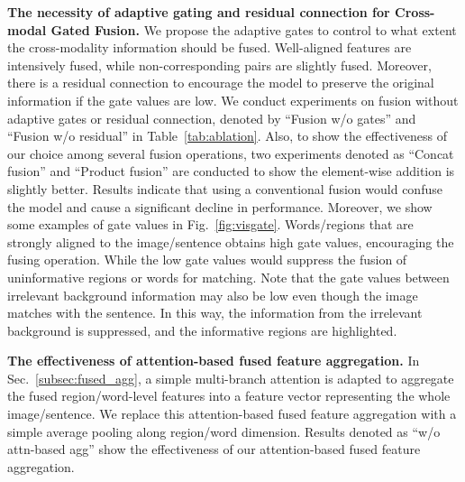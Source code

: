 \documentclass[10pt,twocolumn,letterpaper]{article}
\begin{document}
\noindent\textbf{The necessity of adaptive gating and residual connection for Cross-modal Gated Fusion.}
We propose the adaptive gates to control to what extent the cross-modality information should be fused. 
Well-aligned features are intensively fused, while non-corresponding pairs are slightly fused. 
Moreover, there is a residual connection to encourage the model to preserve the original information if the gate values are low.
We conduct experiments on fusion without adaptive gates or residual connection, denoted by ``Fusion w/o gates'' and ``Fusion w/o residual'' in Table~\ref{tab:ablation}. Also, to show the effectiveness of our choice among several fusion operations, two experiments denoted as ``Concat fusion'' and ``Product fusion'' are conducted to show the element-wise addition is slightly better.
Results 
indicate that using a conventional fusion would confuse the model and cause a significant decline in performance.
Moreover, we show some examples of gate values in Fig.~\ref{fig:visgate}. Words/regions that are strongly aligned to the image/sentence obtains high gate values, encouraging the fusing operation. While the low gate values would suppress the fusion of uninformative regions or words for matching.
Note that the gate values between irrelevant background information may also be low even though the image matches with the sentence.
In this way, the information from the irrelevant background is suppressed, and the informative regions are highlighted.

\noindent\textbf{The effectiveness of attention-based fused feature aggregation.}
In Sec.~\ref{subsec:fused_agg}, a simple multi-branch attention is adapted to aggregate the fused region/word-level features into a feature vector representing the whole image/sentence. 
We replace this attention-based fused feature aggregation with a simple average pooling along region/word dimension. 
Results denoted as ``w/o attn-based agg'' show the effectiveness of our attention-based fused feature aggregation.
\end{document}
